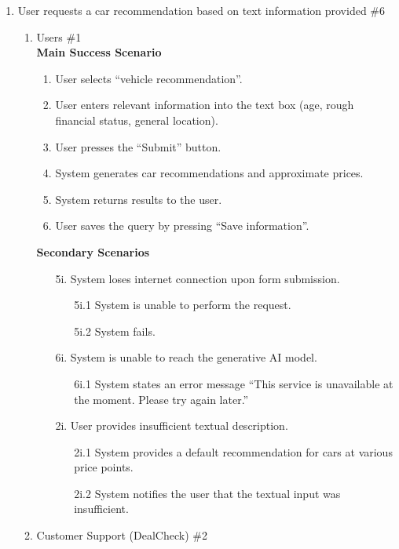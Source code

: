 \documentclass[]{article}
\begin{document}
\begin{enumerate}[{\bf {BE}1.}]
		\item User requests a car recommendation based on text information provided \#6
		\begin{enumerate}[{\bf VP1.}]
		  \item Users \#1 \\
			\textbf{Main Success Scenario}
			\begin{enumerate}[1.]
			  \item User selects ``vehicle recommendation''.
			  \item User enters relevant information into the text box (age, rough financial status, general location).
			  \item User presses the ``Submit'' button.
			  \item System generates car recommendations and approximate prices.
			  \item System returns results to the user.
			  \item User saves the query by pressing ``Save information''.
			\end{enumerate}
			\textbf{Secondary Scenarios}
			\begin{enumerate}
			  \item[5i.] System loses internet connection upon form submission.
			  \begin{enumerate}
				\item[5i.1] System is unable to perform the request.
				\item[5i.2] System fails.
			  \end{enumerate}
			  \item[6i.] System is unable to reach the generative AI model.
			  \begin{enumerate}
				\item[6i.1] System states an error message ``This service is unavailable at the moment. Please try again later.''
			  \end{enumerate}
			  \item[2i.] User provides insufficient textual description.
			  \begin{enumerate}
				\item[2i.1] System provides a default recommendation for cars at various price points.
				\item[2i.2] System notifies the user that the textual input was insufficient.
			  \end{enumerate}
			\end{enumerate}
		  \item Customer Support (DealCheck) \#2
			\begin{enumerate}

\end{enumerate}
\end{enumerate}
\end{enumerate}
\end{document}

